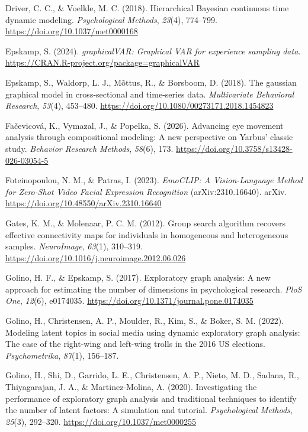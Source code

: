 \documentclass[
]{article}
\newlength{\cslhangindent}
\newenvironment{CSLReferences}[2] %
 {\begin{list}{}{%
  \setlength{\itemindent}{0pt}
  \setlength{\leftmargin}{0pt}
  \setlength{\parsep}{0pt}
  \ifodd #1
   \setlength{\leftmargin}{\cslhangindent}
   \setlength{\itemindent}{-1\cslhangindent}
  \fi
  \setlength{\itemsep}{#2\baselineskip}}}
 {\end{list}}
\begin{document}
\begin{CSLReferences}{1}{0}
Driver, C. C., \& Voelkle, M. C. (2018). Hierarchical {Bayesian}
continuous time dynamic modeling. \emph{Psychological Methods},
\emph{23}(4), 774--799. \url{https://doi.org/10.1037/met0000168}

Epskamp, S. (2024). \emph{graphicalVAR: Graphical VAR for experience
sampling data}. \url{https://CRAN.R-project.org/package=graphicalVAR}

Epskamp, S., Waldorp, L. J., Mõttus, R., \& Borsboom, D. (2018). The
gaussian graphical model in cross-sectional and time-series data.
\emph{Multivariate Behavioral Research}, \emph{53}(4), 453--480.
\url{https://doi.org/10.1080/00273171.2018.1454823}

Fačevicová, K., Vymazal, J., \& Popelka, S. (2026). Advancing eye
movement analysis through compositional modeling: A new perspective on
{Yarbus'} classic study. \emph{Behavior Research Methods}, \emph{58}(6),
173. \url{https://doi.org/10.3758/s13428-026-03054-5}

Foteinopoulou, N. M., \& Patras, I. (2023). \emph{{EmoCLIP}: {A
Vision-Language Method} for {Zero-Shot Video Facial Expression
Recognition}} (arXiv:2310.16640). {arXiv}.
\url{https://doi.org/10.48550/arXiv.2310.16640}

Gates, K. M., \& Molenaar, P. C. M. (2012). Group search algorithm
recovers effective connectivity maps for individuals in homogeneous and
heterogeneous samples. \emph{NeuroImage}, \emph{63}(1), 310--319.
\url{https://doi.org/10.1016/j.neuroimage.2012.06.026}

Golino, H. F., \& Epskamp, S. (2017). Exploratory graph analysis: A new
approach for estimating the number of dimensions in psychological
research. \emph{PloS One}, \emph{12}(6), e0174035.
\url{https://doi.org/10.1371/journal.pone.0174035}

Golino, H., Christensen, A. P., Moulder, R., Kim, S., \& Boker, S. M.
(2022). Modeling latent topics in social media using dynamic exploratory
graph analysis: The case of the right-wing and left-wing trolls in the
2016 US elections. \emph{Psychometrika}, \emph{87}(1), 156--187.

Golino, H., Shi, D., Garrido, L. E., Christensen, A. P., Nieto, M. D.,
Sadana, R., Thiyagarajan, J. A., \& Martinez-Molina, A. (2020).
Investigating the performance of exploratory graph analysis and
traditional techniques to identify the number of latent factors: A
simulation and tutorial. \emph{Psychological Methods}, \emph{25}(3),
292--320. \url{https://doi.org/10.1037/met0000255}


\end{CSLReferences}
\end{document}
